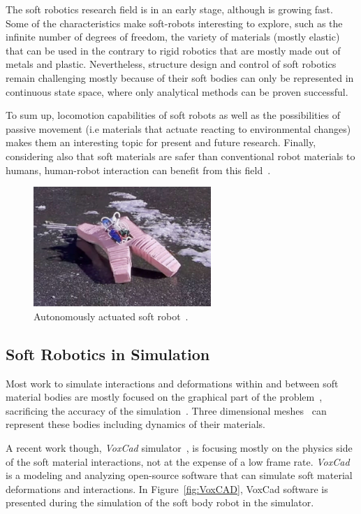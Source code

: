 The soft robotics research field is in an early stage, although is growing fast. Some of the characteristics make soft-robots interesting to explore, such as the infinite number of degrees of freedom, the variety of materials (mostly elastic) that can be used in the contrary to rigid robotics that are mostly made out of metals and plastic. Nevertheless, structure design and control of soft robotics remain challenging mostly because of their soft bodies can only be represented in continuous state space, where only analytical methods can be proven successful.

To sum up, locomotion capabilities of soft robots as well as the possibilities of passive movement (i.e materials that actuate reacting to environmental changes) makes them an interesting topic for present and future research. Finally, considering also that soft materials are safer than conventional robot materials to humans, human-robot interaction can benefit from this field~\citep{sanan2011continuum}.


\begin{figure}[t!]
\centering
\includegraphics[width=0.6\textwidth]{../Figures/Misc/softbot.jpg}
\caption{Autonomously actuated soft robot~\citep{tolleyresilient}.}
\label{fig:softbot}
\end{figure}


\subsection{Soft Robotics in Simulation}

Most work to simulate interactions and deformations within and between soft material bodies are mostly focused on the graphical part of the problem~\citep{faloutsos1997dynamic}, sacrificing the accuracy of the simulation~\citep{teschner2004versatile}. Three dimensional meshes~\citep{muller2002stable} can represent these bodies including dynamics of their materials. 

A recent work though, \emph{VoxCad} simulator~\citep{hiller2012dynamic}, is focusing mostly on the physics side of the soft material interactions, not at the expense of a low frame rate. \emph{VoxCad} is a modeling and analyzing open-source software that can simulate soft material deformations and interactions. In Figure~\ref{fig:VoxCAD}, VoxCad software is presented during the simulation of the soft body robot in the simulator.

